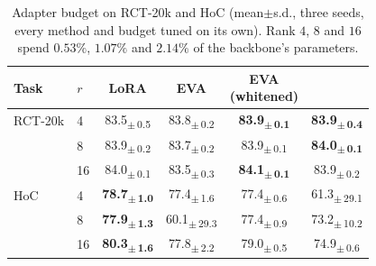 \begin{table}[h]
\centering
\caption{Adapter budget on RCT-20k and HoC (mean$\pm$s.d., three seeds, every method and budget tuned on its own). Rank $4$, $8$ and $16$ spend $0.53\%$, $1.07\%$ and $2.14\%$ of the backbone's parameters.}
\label{tab:budgetx}
\footnotesize
\setlength{\tabcolsep}{2.5pt}
\begin{tabular}{llcccc}
\toprule
Task & $r$ & LoRA & EVA & \shortstack{EVA\\(whitened)} & \method{} \\
\midrule
RCT-20k & 4 & 83.5\textsubscript{$\pm$\,0.5} & 83.8\textsubscript{$\pm$\,0.2} & \textbf{83.9\textsubscript{$\pm$\,0.1}} & \textbf{83.9\textsubscript{$\pm$\,0.4}} \\
 & 8 & 83.9\textsubscript{$\pm$\,0.2} & 83.7\textsubscript{$\pm$\,0.2} & 83.9\textsubscript{$\pm$\,0.1} & \textbf{84.0\textsubscript{$\pm$\,0.1}} \\
 & 16 & 84.0\textsubscript{$\pm$\,0.1} & 83.5\textsubscript{$\pm$\,0.3} & \textbf{84.1\textsubscript{$\pm$\,0.1}} & 83.9\textsubscript{$\pm$\,0.2} \\
\midrule
HoC & 4 & \textbf{78.7\textsubscript{$\pm$\,1.0}} & 77.4\textsubscript{$\pm$\,1.6} & 77.4\textsubscript{$\pm$\,0.6} & 61.3\textsubscript{$\pm$\,29.1} \\
 & 8 & \textbf{77.9\textsubscript{$\pm$\,1.3}} & 60.1\textsubscript{$\pm$\,29.3} & 77.4\textsubscript{$\pm$\,0.9} & 73.2\textsubscript{$\pm$\,10.2} \\
 & 16 & \textbf{80.3\textsubscript{$\pm$\,1.6}} & 77.8\textsubscript{$\pm$\,2.2} & 79.0\textsubscript{$\pm$\,0.5} & 74.9\textsubscript{$\pm$\,0.6} \\
\bottomrule
\end{tabular}
\end{table}
